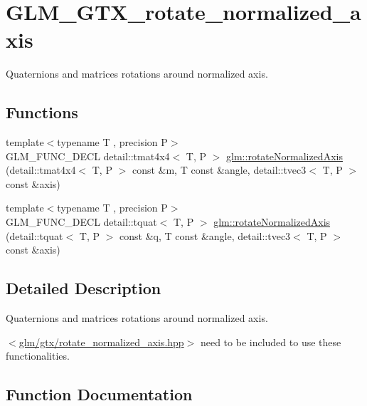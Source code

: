 \hypertarget{group__gtx__rotate__normalized__axis}{}\section{G\+L\+M\+\_\+\+G\+T\+X\+\_\+rotate\+\_\+normalized\+\_\+axis}
\label{group__gtx__rotate__normalized__axis}


Quaternions and matrices rotations around normalized axis.  


\subsection*{Functions}
\begin{DoxyCompactItemize}
\item 
{\footnotesize template$<$typename T , precision P$>$ }\\G\+L\+M\+\_\+\+F\+U\+N\+C\+\_\+\+D\+E\+CL detail\+::tmat4x4$<$ T, P $>$ \hyperlink{group__gtx__rotate__normalized__axis_gac47b4efcecdaf7e892b10ae89135c544}{glm\+::rotate\+Normalized\+Axis} (detail\+::tmat4x4$<$ T, P $>$ const \&m, T const \&angle, detail\+::tvec3$<$ T, P $>$ const \&axis)
\item 
{\footnotesize template$<$typename T , precision P$>$ }\\G\+L\+M\+\_\+\+F\+U\+N\+C\+\_\+\+D\+E\+CL detail\+::tquat$<$ T, P $>$ \hyperlink{group__gtx__rotate__normalized__axis_ga774f0f09fc99b3a967001cb116aa7f2a}{glm\+::rotate\+Normalized\+Axis} (detail\+::tquat$<$ T, P $>$ const \&q, T const \&angle, detail\+::tvec3$<$ T, P $>$ const \&axis)
\end{DoxyCompactItemize}


\subsection{Detailed Description}
Quaternions and matrices rotations around normalized axis. 

$<$\hyperlink{rotate__normalized__axis_8hpp}{glm/gtx/rotate\+\_\+normalized\+\_\+axis.\+hpp}$>$ need to be included to use these functionalities. 

\subsection{Function Documentation}
